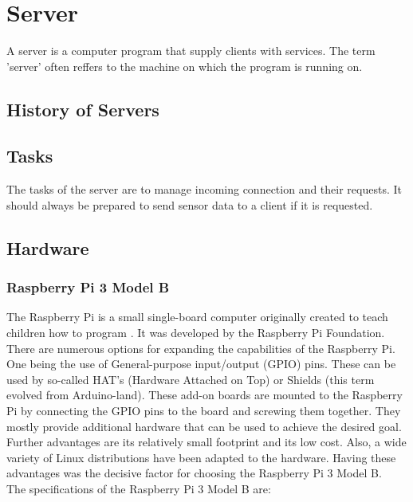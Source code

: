 \chapter{Server}
\label{ch:server}
A server is a computer program that supply clients with services. The term 'server' often reffers to the machine on which the program is running on. 

\section{History of Servers}


\section{Tasks}
The tasks of the server are to manage incoming connection and their requests. It should always be prepared to send sensor data to a client if it is requested.

\section{Hardware}
\subsection{Raspberry Pi 3 Model B}
The Raspberry Pi is a small single-board computer originally created to teach children how to program \cite{RasPi}. It was developed by the Raspberry Pi Foundation. There are numerous options for expanding the capabilities of the Raspberry Pi. One being the use of General-purpose input/output (GPIO) pins. These can be used by so-called HAT's (Hardware Attached on Top) or Shields (this term evolved from Arduino-land). These add-on boards are mounted to the Raspberry Pi by connecting the GPIO pins to the board and screwing them together. They mostly provide additional hardware that can be used to achieve the desired goal. Further advantages are its relatively small footprint and its low cost. Also, a wide variety of Linux distributions have been adapted to the hardware. Having these advantages was the decisive factor for choosing the Raspberry Pi 3 Model B.\\
The specifications of the Raspberry Pi 3 Model B are:

